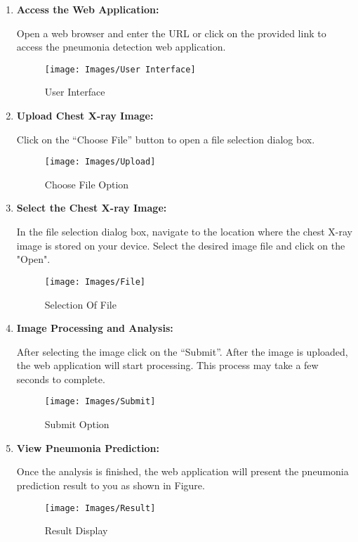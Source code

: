 \begin{enumerate} [label=Step \arabic*:]
	\item \textbf {Access the Web Application:}
	
	Open a web browser and enter the URL or click on the provided link to access the pneumonia detection web application.
		\begin{figure}[h!]
			\centering
			\texttt{[image: Images/User Interface]}
			\caption{User Interface}
		\end{figure}
	
	\item \textbf {Upload Chest X-ray Image:}
	
	Click on the “Choose File” button to open a file selection dialog box. 
		\begin{figure}[h!]
			\centering
			\texttt{[image: Images/Upload]}
			\caption{Choose File Option}
		\end{figure}
	
	\item \textbf {Select the Chest X-ray Image:} 
	
	In the file selection dialog box, navigate to the location where the chest X-ray image is stored on your device. Select the desired image file and click on the "Open".
		\begin{figure}[h!]
			\centering
			\texttt{[image: Images/File]}
			\caption{Selection Of File}
		\end{figure}
	
	\item \textbf {Image Processing and Analysis:}
	
	After selecting the image click on the “Submit”. After the image is uploaded, the web application will start processing. This process may take a few seconds to complete.
		\begin{figure}[h!]
			\centering
			\texttt{[image: Images/Submit]}
			\caption{Submit Option}
		\end{figure}
	
	\item \textbf {View Pneumonia Prediction:} 
	
	Once the analysis is finished, the web application will present the pneumonia prediction result to you as shown in Figure.
		\begin{figure}[h!]
			\centering
			\texttt{[image: Images/Result]}
			\caption{Result Display}
		\end{figure}	
	

\end{enumerate}
